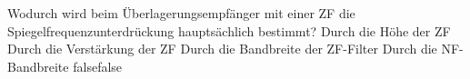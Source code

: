     {Wodurch wird beim Überlagerungsempfänger mit einer ZF die Spiegelfrequenzunterdrückung hauptsächlich bestimmt?}
    {Durch die Höhe der ZF}
    {Durch die Verstärkung der ZF}
    {Durch die Bandbreite der ZF-Filter}
    {Durch die NF-Bandbreite}
    {false}{false}